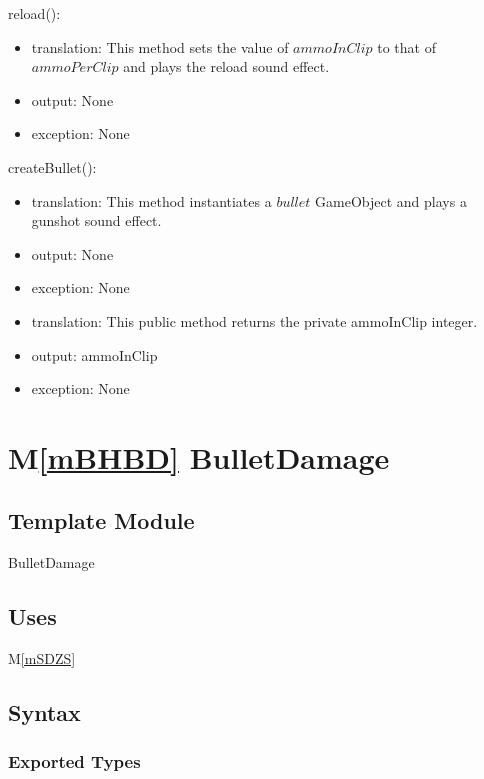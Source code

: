 \documentclass[12pt]{article}
\newcommand{\mref}[1]{M\ref{#1}}
\begin{document}
\noindent reload():
\begin{itemize}
	\item translation: This method sets the value of $ammoInClip$ to that of $ammoPerClip$ and plays the reload sound effect.
	\item output: None
	\item exception: None
\end{itemize}

\noindent createBullet():
\begin{itemize}
	\item translation: This method instantiates a $bullet$ GameObject and plays a gunshot sound effect.
	\item output: None
	\item exception: None
\end{itemize}

\begin{itemize}
	\item {\color {magenta} translation: This public method returns the private ammoInClip integer.}
	\item {\color {magenta} output: ammoInClip}
	\item {\color {magenta} exception: None} 
\end{itemize}

\newpage
\section*{\mref{mBHBD} BulletDamage}

\subsection*{Template Module}

BulletDamage

\subsection* {Uses}

\mref{mSDZS}

\subsection* {Syntax}

\subsubsection* {Exported Types}
\end{document}
